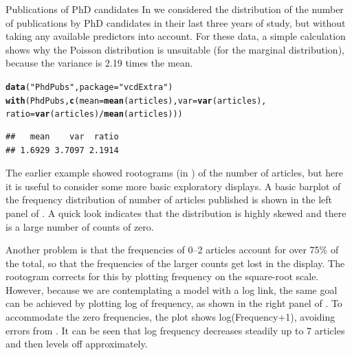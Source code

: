 \documentclass[11pt]{book}\usepackage[]{graphicx}\usepackage[]{color}
\makeatletter
\newcommand{\hlstr}[1]{\textcolor[rgb]{0.192,0.494,0.8}{#1}}%
\newcommand{\hlopt}[1]{\textcolor[rgb]{0,0,0}{#1}}%
\newcommand{\hlstd}[1]{\textcolor[rgb]{0.345,0.345,0.345}{#1}}%
\newcommand{\hlkwc}[1]{\textcolor[rgb]{0.333,0.667,0.333}{#1}}%
\newcommand{\hlkwd}[1]{\textcolor[rgb]{0.737,0.353,0.396}{\textbf{#1}}}%
\newenvironment{kframe}{%
 \def\at@end@of@kframe{}%
 \ifinner\ifhmode%
  \def\at@end@of@kframe{\end{minipage}}%
  \begin{minipage}{\columnwidth}%
 \fi\fi%
 \def\FrameCommand##1{\hskip\@totalleftmargin \hskip-\fboxsep
 \colorbox{shadecolor}{##1}\hskip-\fboxsep
     \hskip-\linewidth \hskip-\@totalleftmargin \hskip\columnwidth}%
 \MakeFramed {\advance\hsize-\width
   \@totalleftmargin\z@ \linewidth\hsize
   \@setminipage}}%
 {\par\unskip\endMakeFramed%
 \at@end@of@kframe}
\newenvironment{knitrout}{}{} %
\renewenvironment{knitrout}{\small\renewcommand{\baselinestretch}{.85}}{} %
\makeatother
\begin{document}
\begin{Example}[phdpubs1]{Publications of PhD candidates}
In  we considered the distribution of the number of
publications by PhD candidates in their last three years of study,
but without taking any available predictors into account.
For these data, a simple calculation shows why the Poisson distribution
is unsuitable (for the marginal distribution), because the variance is 2.19 times the mean.

\begin{knitrout}
\color{fgcolor}\begin{kframe}
\begin{alltt}
\hlkwd{data}\hlstd{(}\hlstr{"PhdPubs"}\hlstd{,} \hlkwc{package}\hlstd{=}\hlstr{"vcdExtra"}\hlstd{)}
\hlkwd{with}\hlstd{(PhdPubs,} \hlkwd{c}\hlstd{(}\hlkwc{mean}\hlstd{=}\hlkwd{mean}\hlstd{(articles),} \hlkwc{var}\hlstd{=}\hlkwd{var}\hlstd{(articles),}
                \hlkwc{ratio}\hlstd{=}\hlkwd{var}\hlstd{(articles)}\hlopt{/}\hlkwd{mean}\hlstd{(articles)))}
\end{alltt}
\begin{verbatim}
##   mean    var  ratio 
## 1.6929 3.7097 2.1914
\end{verbatim}
\end{kframe}
\end{knitrout}
The earlier example showed rootograms (in )
of the number of articles, but here it is useful to consider some more
basic exploratory displays.  A basic barplot of the frequency distribution
of number of articles published is shown in the left panel of
.  A quick look indicates that the distribution
is highly skewed and there is a large number of counts of zero.

Another problem is that the frequencies of 0--2 articles account for
over 75\% of the total, so that the frequencies of the larger counts
get lost in the display.  The rootogram corrects for this by plotting
frequency on the square-root scale.  However, because we are contemplating
a model with a log link, the same goal can be achieved by plotting
log of frequency, as shown in the right panel of .
To accommodate the zero frequencies, the plot shows log(Frequency+1),
avoiding errors from .
It can be seen that log frequency decreases steadily up to 7 articles and
then levels off approximately.


\end{Example}
\end{document}
